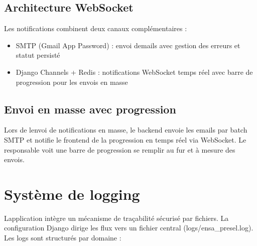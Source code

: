 \subsection{Architecture WebSocket}

Les notifications combinent deux canaux complémentaires :

\begin{itemize}
\item
  SMTP (Gmail App Password) : envoi d\textquotesingle emails avec
  gestion des erreurs et statut persisté
\item
  Django Channels + Redis : notifications WebSocket temps réel avec
  barre de progression pour les envois en masse
\end{itemize}

\subsection{Envoi en masse avec
progression}

Lors de l\textquotesingle envoi de notifications en masse, le backend
envoie les emails par batch SMTP et notifie le frontend de la
progression en temps réel via WebSocket. Le responsable voit une barre
de progression se remplir au fur et à mesure des envois.

\section{Système de logging}

L\textquotesingle application intègre un mécanisme de traçabilité
sécurisé par fichiers. La configuration Django dirige les flux vers un
fichier central (logs/ensa\_presel.log). Les logs sont structurés par
domaine :

